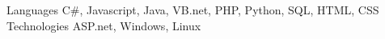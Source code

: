\begin{cvskills}
  \cvskill
    {Languages}
    {C\#, Javascript, Java, VB.net, PHP, Python, SQL, HTML, CSS}
  \cvskill
    {Technologies}
    {ASP.net, Windows, Linux}
\end{cvskills}

